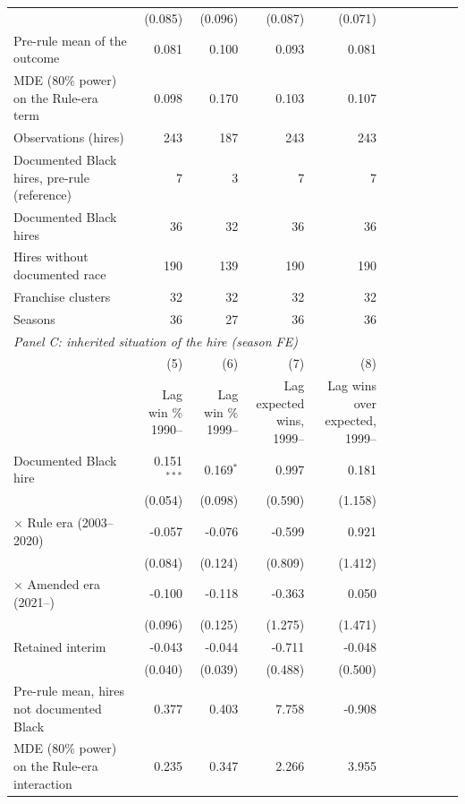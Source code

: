 \begin{table}[H]
{\begin{tabular}{lrrrrrrrrrr}
 & (0.085) & (0.096) & (0.087) & (0.071) & & & & & & \\
Pre-rule mean of the outcome & 0.081 & 0.100 & 0.093 & 0.081 & & & & & & \\
MDE (80\% power) on the Rule-era term & 0.098 & 0.170 & 0.103 & 0.107 & & & & & & \\
Observations (hires) & 243 & 187 & 243 & 243 & & & & & & \\
Documented Black hires, pre-rule (reference) & 7 & 3 & 7 & 7 & & & & & & \\
Documented Black hires & 36 & 32 & 36 & 36 & & & & & & \\
Hires without documented race & 190 & 139 & 190 & 190 & & & & & & \\
Franchise clusters & 32 & 32 & 32 & 32 & & & & & & \\
Seasons & 36 & 27 & 36 & 36 & & & & & & \\
\midrule
\multicolumn{11}{l}{\textit{Panel C: inherited situation of the hire (season FE)}} \\
 & (5) & (6) & (7) & (8) & & & & & & \\
 & \shortstack{Lag win \%\\1990--} & \shortstack{Lag win \%\\1999--} & \shortstack{Lag expected\\wins, 1999--} & \shortstack{Lag wins over\\expected, 1999--} & & & & & & \\
\cmidrule(lr){2-5}
Documented Black hire & 0.151$^{***}$ & 0.169$^{*}$ & 0.997 & 0.181 & & & & & & \\
 & (0.054) & (0.098) & (0.590) & (1.158) & & & & & & \\
$\times$ Rule era (2003--2020) & -0.057 & -0.076 & -0.599 & 0.921 & & & & & & \\
 & (0.084) & (0.124) & (0.809) & (1.412) & & & & & & \\
$\times$ Amended era (2021--) & -0.100 & -0.118 & -0.363 & 0.050 & & & & & & \\
 & (0.096) & (0.125) & (1.275) & (1.471) & & & & & & \\
Retained interim & -0.043 & -0.044 & -0.711 & -0.048 & & & & & & \\
 & (0.040) & (0.039) & (0.488) & (0.500) & & & & & & \\
Pre-rule mean, hires not documented Black & 0.377 & 0.403 & 7.758 & -0.908 & & & & & & \\
MDE (80\% power) on the Rule-era interaction & 0.235 & 0.347 & 2.266 & 3.955 & & & & & & \\

\end{tabular}}
\end{table}
